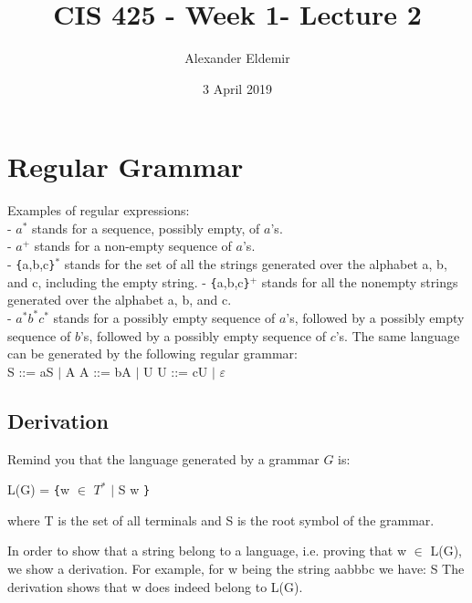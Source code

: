 \documentclass{article}
\title{CIS 425 - Week 1-  Lecture 2}
\author{Alexander Eldemir}
\date{3 April 2019}
\begin{document}
\maketitle

\section{Regular Grammar}
Examples of regular expressions: \\
- $a^*$ stands for a sequence, possibly empty, of $a$'s.  \\
- $a^+$ stands for a non-empty sequence of $a$'s.  \\
- \verb|{|a,b,c\verb|}|$^{*}$ stands for the set of all the strings generated over the alphabet a, b, and c, including the empty string. 
\newline
- \verb|{|a,b,c\verb|}|$^{+}$  stands for all the nonempty strings generated over the alphabet a, b, and c.  \\
-
$a^{*}b^{*}c^{*}$  stands for a possibly empty sequence of $a$'s, followed by a possibly empty sequence of $b$'s, followed by 
a possibly empty sequence of $c$'s. 
The same language can be generated by 
 the following regular grammar:\\
 \newline
S ::= aS $\mid$ A  
\newline
A ::= bA $\mid$ U
\newline
U ::= cU $\mid$ $\varepsilon$



\subsection*{Derivation}
Remind you that the language generated by a grammar $G$ is:
\begin{center}
L(G) = \verb|{|w $\in$ $T^{*}$ $\mid$ S \textrightarrow{$^{+}$} w \verb|}|
\end{center}
where T is the set of all terminals and S is the root symbol of the grammar.

In order to show that a string belong to a language, i.e. proving that w $\in$ L(G), we show
a derivation.  For example, for w being the string 
aabbbc we have:
\newline\newline
S 
\newline\newline 
The derivation shows that w does indeed belong to L(G).
\end{document}
